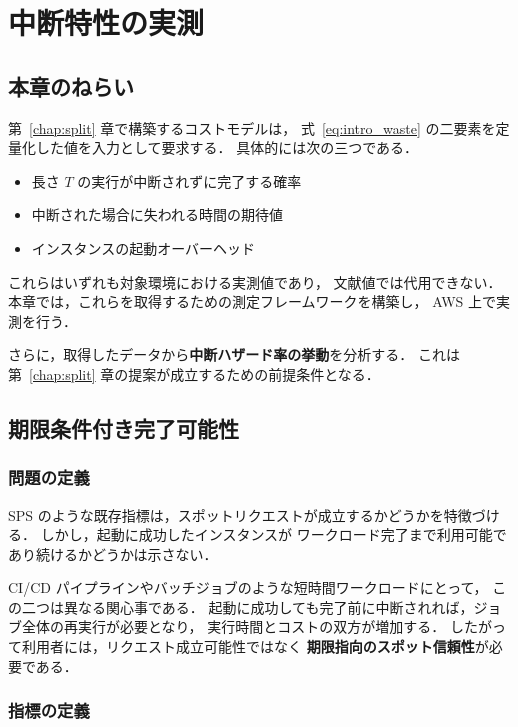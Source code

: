 \documentclass[11pt,a4paper]{ltjsreport}
\begin{document}
\chapter{中断特性の実測}
\label{chap:measure}

\section{本章のねらい}

第~\ref{chap:split} 章で構築するコストモデルは，
式~\eqref{eq:intro_waste} の二要素を定量化した値を入力として要求する．
具体的には次の三つである．

\begin{itemize}
  \item 長さ $T$ の実行が中断されずに完了する確率
  \item 中断された場合に失われる時間の期待値
  \item インスタンスの起動オーバーヘッド
\end{itemize}

これらはいずれも対象環境における実測値であり，
文献値では代用できない．
本章では，これらを取得するための測定フレームワークを構築し，
AWS 上で実測を行う．

さらに，取得したデータから\textbf{中断ハザード率の挙動}を分析する．
これは第~\ref{chap:split} 章の提案が成立するための前提条件となる．

\section{期限条件付き完了可能性}

\subsection{問題の定義}

SPS のような既存指標は，スポットリクエストが成立するかどうかを特徴づける．
しかし，起動に成功したインスタンスが
ワークロード完了まで利用可能であり続けるかどうかは示さない．

CI/CD パイプラインやバッチジョブのような短時間ワークロードにとって，
この二つは異なる関心事である．
起動に成功しても完了前に中断されれば，ジョブ全体の再実行が必要となり，
実行時間とコストの双方が増加する．
したがって利用者には，リクエスト成立可能性ではなく
\textbf{期限指向のスポット信頼性}が必要である．

\subsection{指標の定義}
\end{document}
